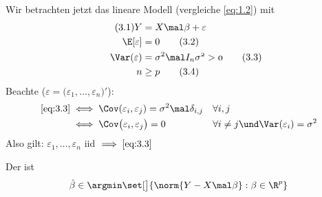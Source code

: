 Wir betrachten jetzt das lineare Modell (vergleiche \eqref{eq:1.2}) mit 
\begin{align}\label{eq:3.1}\tag{3.1}
	Y&=X\mal\beta+\varepsilon\\
	\E[\varepsilon]&=0\label{eq:3.2}\tag{3.2}\\
	\Var(\varepsilon)&=\sigma^2\mal I_n\mit\sigma^2>0\label{eq:3.3}\tag{3.3}\\
	n&\geq p\label{eq:3.4}\tag{3.4}
\end{align}
Beachte ($\varepsilon=\big(\varepsilon_1,\ldots,\varepsilon_n\big)'$):
\begin{align*}
	\eqref{eq:3.3}&\iff\Cov(\varepsilon_i,\varepsilon_j)=\sigma^2\mal\delta_{i,j}
	&&\forall i,j\\
	&\iff\Cov\big(\varepsilon_i,\varepsilon_j\big)=0
	&&\forall i\neq j\und\Var(\varepsilon_i)=\sigma^2
\end{align*}
Also gilt: $\varepsilon_1,\ldots,\varepsilon_n$ iid $\implies\eqref{eq:3.3}$








\begin{definition}
	Der  ist
	\begin{align*}
		\hat{\beta}\in\argmin\set[\big]{\norm{Y-X\mal\beta}:\beta\in\R^p}
	\end{align*}
\end{definition}